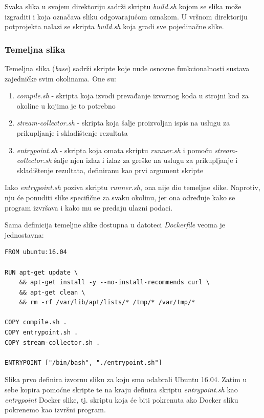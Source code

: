 \documentclass[times, utf8, zavrsni]{fer}
\begin{document}
Svaka slika u svojem direktoriju sadrži skriptu {\textit{build.sh}} kojom se slika može izgraditi i koja označava sliku odgovarajućom oznakom. U vršnom direktoriju potprojekta nalazi se skripta {\textit{build.sh}} koja gradi sve pojedinačne slike.

\subsubsection{Temeljna slika}

Temeljna slika ({\textit{base}}) sadrži skripte koje nude osnovne funkcionalnosti sustava zajedničke svim okolinama. One su:

\begin{enumerate}
\item {\textit{compile.sh}} - skripta koja izvodi prevađanje izvornog koda u strojni kod za okoline u kojima je to potrebno
\item {\textit{stream-collector.sh}} - skripta koja šalje proizvoljan ispis na uslugu za prikupljanje i skladištenje rezultata
\item {\textit{entrypoint.sh}} - skripta koja omata skriptu {\textit{runner.sh}} i pomoću {\textit{stream-collector.sh}} šalje njen izlaz i izlaz za greške na uslugu za prikupljanje i skladištenje rezultata, definiranu kao prvi argument skripte
\end{enumerate}

Iako {\textit{entrypoint.sh}} poziva skriptu {\textit{runner.sh}}, ona nije dio temeljne slike. Naprotiv, nju će ponuditi slike specifične za svaku okolinu, jer ona određuje kako se program izvršava i kako mu se predaju ulazni podaci.

Sama definicija temeljne slike dostupna u datoteci {\textit{Dockerfile}} veoma je jednostavna:

\begin{lstlisting}
FROM ubuntu:16.04

RUN apt-get update \
    && apt-get install -y --no-install-recommends curl \
    && apt-get clean \
    && rm -rf /var/lib/apt/lists/* /tmp/* /var/tmp/*

COPY compile.sh .
COPY entrypoint.sh .
COPY stream-collector.sh .

ENTRYPOINT ["/bin/bash", "./entrypoint.sh"]
\end{lstlisting}

Slika prvo definira izvornu sliku za koju smo odabrali Ubuntu 16.04. Zatim u sebe kopira pomoćne skripte te na kraju definira skriptu {\textit{entrypoint.sh}} kao {\textit{entrypoint}} Docker slike, tj. skriptu koja će biti pokrenuta ako Docker sliku pokrenemo kao izvršni program.
\end{document}
